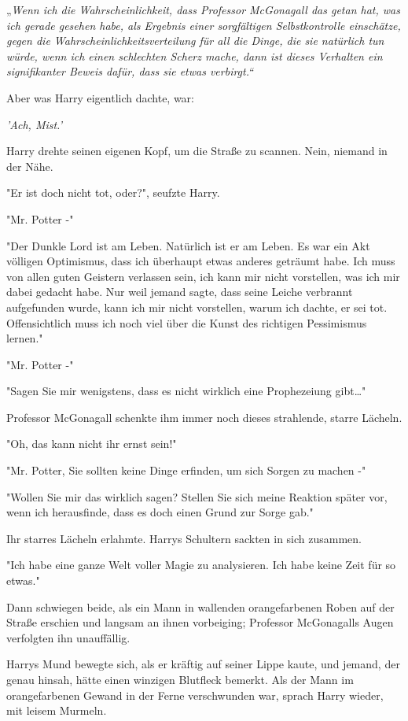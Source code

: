 {„\emph{Wenn ich die Wahrscheinlichkeit, dass Professor McGonagall das getan hat, was ich gerade gesehen habe, als Ergebnis einer sorgfältigen Selbstkontrolle einschätze, gegen die Wahrscheinlichkeitsverteilung für all die Dinge, die sie natürlich tun würde, wenn ich einen schlechten Scherz mache, dann ist dieses Verhalten ein signifikanter Beweis dafür, dass sie etwas verbirgt.“}

Aber was Harry eigentlich dachte, war:

\emph{'Ach, Mist.'}

Harry drehte seinen eigenen Kopf, um die Straße zu scannen. Nein, niemand in der Nähe.

"Er ist doch nicht tot, oder?", seufzte Harry.

"Mr. Potter -"

"Der Dunkle Lord ist am Leben. Natürlich ist er am Leben. Es war ein Akt völligen Optimismus, dass ich überhaupt etwas anderes geträumt habe. Ich muss von allen guten Geistern verlassen sein, ich kann mir nicht vorstellen, was ich mir dabei gedacht habe. Nur weil jemand sagte, dass seine Leiche verbrannt aufgefunden wurde, kann ich mir nicht vorstellen, warum ich dachte, er sei tot. Offensichtlich muss ich noch viel über die Kunst des richtigen Pessimismus lernen."

"Mr. Potter -"

"Sagen Sie mir wenigstens, dass es nicht wirklich eine Prophezeiung gibt…"

Professor McGonagall schenkte ihm immer noch dieses strahlende, starre Lächeln.

"Oh, das kann nicht ihr ernst sein!"

"Mr. Potter, Sie sollten keine Dinge erfinden, um sich Sorgen zu machen -"

"Wollen Sie mir das wirklich sagen? Stellen Sie sich meine Reaktion später vor, wenn ich herausfinde, dass es doch einen Grund zur Sorge gab."

Ihr starres Lächeln erlahmte. Harrys Schultern sackten in sich zusammen.

"Ich habe eine ganze Welt voller Magie zu analysieren. Ich habe keine Zeit für so etwas."

Dann schwiegen beide, als ein Mann in wallenden orangefarbenen Roben auf der Straße erschien und langsam an ihnen vorbeiging; Professor McGonagalls Augen verfolgten ihn unauffällig.

Harrys Mund bewegte sich, als er kräftig auf seiner Lippe kaute, und jemand, der genau hinsah, hätte einen winzigen Blutfleck bemerkt. Als der Mann im orangefarbenen Gewand in der Ferne verschwunden war, sprach Harry wieder, mit leisem Murmeln.

}
